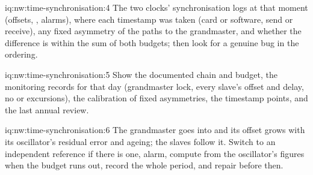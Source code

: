 \begin{solution}{iq:nw:time-synchronisation:4}
The two clocks' synchronisation logs at that moment (offsets, , alarms), where each timestamp was taken (card or software, send or
receive), any fixed asymmetry of the paths to the grandmaster, and whether the difference is within the sum of both budgets; then look
for a genuine bug in the ordering.
\end{solution}

\begin{solution}{iq:nw:time-synchronisation:5}
Show the documented chain and budget, the monitoring records for that day (grandmaster lock, every slave's offset and delay, no
 or excursions), the calibration of fixed asymmetries, the timestamp points, and the last annual review.
\end{solution}

\begin{solution}{iq:nw:time-synchronisation:6}
The grandmaster goes into  and its offset grows with its oscillator's residual error and ageing; the slaves follow it. Switch to
an independent reference if there is one, alarm, compute from the oscillator's figures when the budget runs out, record the whole
period, and repair before then.
\end{solution}
